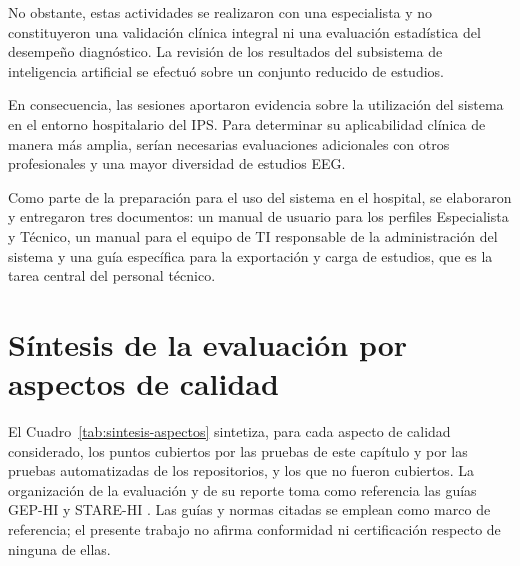 No obstante, estas actividades se realizaron con una especialista y no constituyeron una validación clínica integral ni una evaluación estadística del desempeño diagnóstico. La revisión de los resultados del subsistema de inteligencia artificial se efectuó sobre un conjunto reducido de estudios.

En consecuencia, las sesiones aportaron evidencia sobre la utilización del sistema en el entorno hospitalario del IPS. Para determinar su aplicabilidad clínica de manera más amplia, serían necesarias evaluaciones adicionales con otros profesionales y una mayor diversidad de estudios EEG.

Como parte de la preparación para el uso del sistema en el hospital, se elaboraron y entregaron tres documentos: un manual de usuario para los perfiles Especialista y Técnico, un manual para el equipo de TI responsable de la administración del sistema y una guía específica para la exportación y carga de estudios, que es la tarea central del personal técnico.


\section{Síntesis de la evaluación por aspectos de calidad}
\label{sec:sintesis-aspectos}

El Cuadro~\ref{tab:sintesis-aspectos} sintetiza, para cada aspecto de calidad considerado, los puntos cubiertos por las pruebas de este capítulo y por las pruebas automatizadas de los repositorios, y los que no fueron cubiertos.
La organización de la evaluación y de su reporte toma como referencia las guías GEP-HI \citep{Nykanen2011GEPHI} y STARE-HI \citep{Talmon2009STAREHI}.
Las guías y normas citadas se emplean como marco de referencia; el presente trabajo no afirma conformidad ni certificación respecto de ninguna de ellas.

